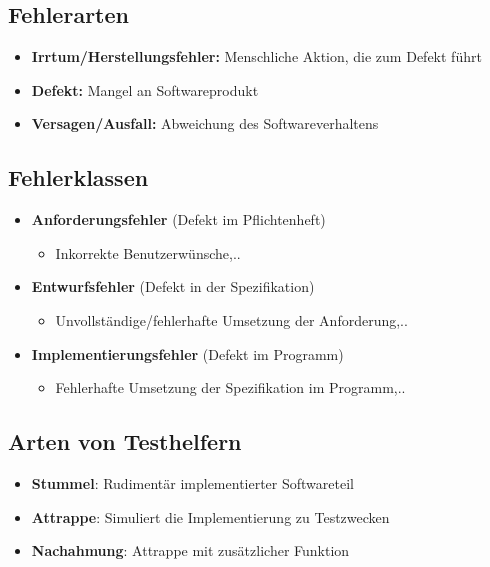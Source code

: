 \documentclass[parskip=full, 12pt]{scrartcl}
\begin{document}
		\subsection{Fehlerarten}
	
			\begin{itemize}
				\item \textbf{Irrtum/Herstellungsfehler:} Menschliche Aktion, die zum Defekt führt
				\item \textbf{Defekt:} Mangel an Softwareprodukt
				\item \textbf{Versagen/Ausfall:} Abweichung des Softwareverhaltens
			\end{itemize}
		
		\subsection{Fehlerklassen}
	
			\begin{itemize}
				\item \textbf{Anforderungsfehler} (Defekt im Pflichtenheft)
				\begin{itemize}
					\item Inkorrekte Benutzerwünsche,..
				\end{itemize}
				\item \textbf{Entwurfsfehler} (Defekt in der Spezifikation)
				\begin{itemize}
					\item Unvollständige/fehlerhafte Umsetzung der Anforderung,..
				\end{itemize}
				\item \textbf{Implementierungsfehler} (Defekt im Programm)
				\begin{itemize}
					\item Fehlerhafte Umsetzung der Spezifikation im Programm,..
				\end{itemize}
			\end{itemize}
	
		\subsection{Arten von Testhelfern}
		
			\begin{itemize}
				\item \textbf{Stummel}: Rudimentär implementierter Softwareteil
				\item \textbf{Attrappe}: Simuliert die Implementierung zu Testzwecken
				\item \textbf{Nachahmung}: Attrappe mit zusätzlicher Funktion
			\end{itemize}
	
\end{document}
